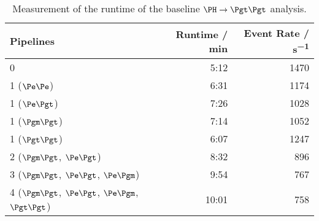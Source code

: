\documentclass[3p]{elsarticle}
\begin{document}
\begin{table}[!ht]
\centering
\begin{tabular}{lrr}
\toprule
\textbf{Pipelines}                                & \textbf{Runtime / \si{min}} & \textbf{Event Rate / \si{s^{-1}} } \\ \midrule
 0                                                & 5:12                             & 1470 \\ \midrule
 1 ($\Pe\Pe$)                                     & 6:31                             & 1174 \\
 1 ($\Pe\Pgt$)                                    & 7:26                             & 1028 \\
 1 ($\Pgm\Pgt$)                                   & 7:14                             & 1052 \\
 1 ($\Pgt\Pgt$)                                   & 6:07                             & 1247 \\ \midrule
 2 ($\Pgm\Pgt$, $\Pe\Pgt$)                        & 8:32                             & 896 \\
 3 ($\Pgm\Pgt$, $\Pe\Pgt$, $\Pe\Pgm$)             & 9:54                             & 767 \\
 4 ($\Pgm\Pgt$, $\Pe\Pgt$, $\Pe\Pgm$, $\Pgt\Pgt$) & 10:01                            & 758 \\
\bottomrule
\end{tabular}
\caption[Measurement of the runtime of the baseline $\PH\to\Pgt\Pgt$ analysis.]{Measurement of the runtime of the baseline $\PH\to\Pgt\Pgt$ analysis.
}
\end{table}
\end{document}
